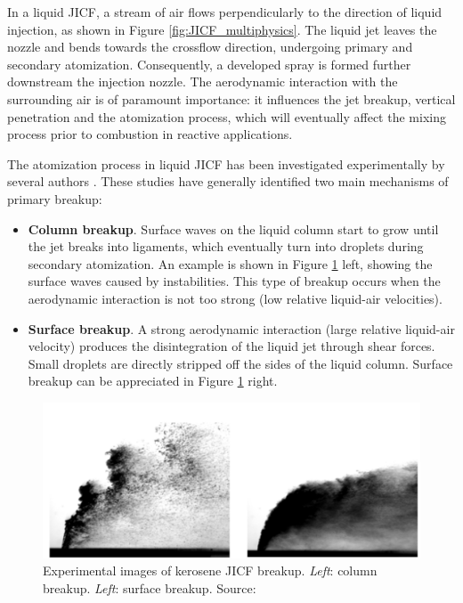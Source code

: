 In a liquid JICF, a stream of air flows perpendicularly to the direction of liquid injection, as shown in Figure \ref{fig:JICF_multiphysics}. The liquid jet leaves the nozzle and bends towards the crossflow direction, undergoing primary and secondary atomization. Consequently, a developed spray is formed further downstream the injection nozzle. The aerodynamic interaction with the surrounding air is of paramount importance: it influences the jet breakup, vertical penetration and the atomization process, which will eventually affect the mixing process prior to combustion in reactive applications.


The atomization process in liquid JICF has been investigated experimentally by several authors . These studies have generally identified two main mechanisms of primary breakup:

\begin{itemize}

	\item \textbf{Column breakup}. Surface waves on the liquid column start to grow until the jet breaks into ligaments, which eventually turn into droplets during secondary atomization. An example is shown in Figure \ref{fig:JICF_breakup_mechanisms_freitag} left, showing the surface waves caused by instabilities. This type of breakup occurs when the aerodynamic interaction is not too strong (low relative liquid-air velocities).

\item \textbf{Surface breakup}. A strong aerodynamic interaction (large relative liquid-air velocity) produces the disintegration of the liquid jet through shear forces. Small droplets are directly
stripped off the sides of the liquid column. Surface breakup can be appreciated in Figure \ref{fig:JICF_breakup_mechanisms_freitag} right. 

\end{itemize}

\begin{figure}[h!]
	\centering
	\includegraphics[scale=0.65]{./part0_intro/JICF_breakup-mechanisms_freitag}
	\caption[Experimental images of kerosene JICF breakup]{Experimental images of kerosene JICF breakup. \textsl{Left}: column breakup. \textsl{Left}: surface breakup. Source: }
	\label{fig:JICF_breakup_mechanisms_freitag}
\end{figure}

